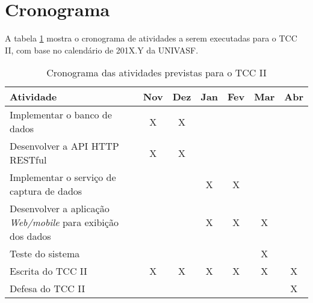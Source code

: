 
\section{Cronograma} \label{sec:Cronograma}

A tabela \ref{tab:cronograma} mostra o cronograma de atividades a serem executadas para o TCC II, com base no calendário de 201X.Y da UNIVASF.

\newpage
\begin{table}[!thb]
    \centering
    \caption{\label{tab:cronograma} Cronograma das atividades previstas para o TCC II}
    \begin{adjustbox}{max width=\textwidth}
    \begin{tabular}{p{6.5cm}|c|c|c|c|c|c}
    \toprule
    \textbf{Atividade}                      & Nov & Dez & Jan & Fev & Mar & Abr \\ \hline
    Implementar o banco de dados              & X    & X     &       &        &          &          \\ \hline
    Desenvolver a API HTTP RESTful                      &   X   & X     &       &        &          &          \\ \hline
    Implementar o serviço de captura de dados        &      &      & X     &   X     &          &          \\ \hline
    Desenvolver a aplicação \textit{Web/mobile} para exibição dos dados         &      &      & X     &   X     &     X     &          \\ \hline
    Teste do sistema            &      &       &       &        & X        &          \\ \hline
    Escrita do TCC II                       &   X   & X     & X     & X      & X        & X        \\ \hline
  Defesa do TCC II                        &      &       &       &        &          & X       \\
    \bottomrule
    \end{tabular}
    \end{adjustbox}
\end{table}